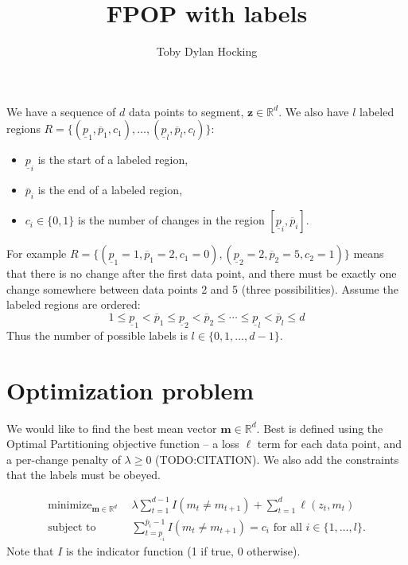 \documentclass{article}
\DeclareMathOperator*{\minimize}{minimize}
\newcommand{\RR}{\mathbb R}
\begin{document}
\title{FPOP with labels}
\author{Toby Dylan Hocking}
\maketitle

We have a sequence of $d$ data points to segment,
$\mathbf z\in\mathbb R^d$. We also have $l$ labeled regions
$R=\{(\underline p_1, \overline p_1, c_1), \dots,
(\underline p_l, \overline p_l, c_l)\}$:
\begin{itemize}
\item $\underline p_i$ is the start of a labeled region,
\item $\overline p_i$ is the end of a labeled region,
\item $c_i\in\{0,1\}$ is the number of changes in the region
  $[\underline p_i, \overline p_i]$. 
\end{itemize}
For example
$R=\{(\underline p_1=1,\overline p_1=2,c_1=0),(\underline
p_2=2,\overline p_2=5,c_2=1)\}$ means that there is no change after
the first data point, and there must be exactly one change somewhere
between data points 2 and 5 (three possibilities). Assume the
labeled regions are ordered:
\begin{equation}
  \label{eq:sorted}
  1 \leq 
\underline p_1 < \overline p_1 \leq 
\underline p_2 < \overline p_2 \leq
\cdots \leq 
\underline p_l < \overline p_l \leq 
d
\end{equation}
Thus the number of possible labels is $l\in\{0, 1, \dots, d-1\}$.

\section{Optimization problem}

We would like to find the best mean vector $\mathbf m\in\mathbb R^d$.
Best is defined using the Optimal Partitioning objective function -- a
loss $\ell$ term for each data point, and a per-change penalty of
$\lambda\geq 0$ (TODO:CITATION). We also add the constraints that the
labels must be obeyed.

\begin{align}
\minimize_{
  \mathbf m\in\RR^{d}
  } &\ \ 
\lambda\sum_{t=1}^{d-1} I(m_t \neq m_{t+1})
+
\sum_{t=1}^d \ell(z_t, m_t) 
  \label{LabeledProb}
\\
    \text{subject to} 
& \ \ \sum_{t=\underline p_i}^{\overline p_i-1} I(m_t \neq m_{t+1})=c_i
\text{ for all } i\in\{1,\dots,l\}.
\nonumber
\end{align}
Note that $I$ is the indicator function (1 if true, 0 otherwise).
\end{document}

